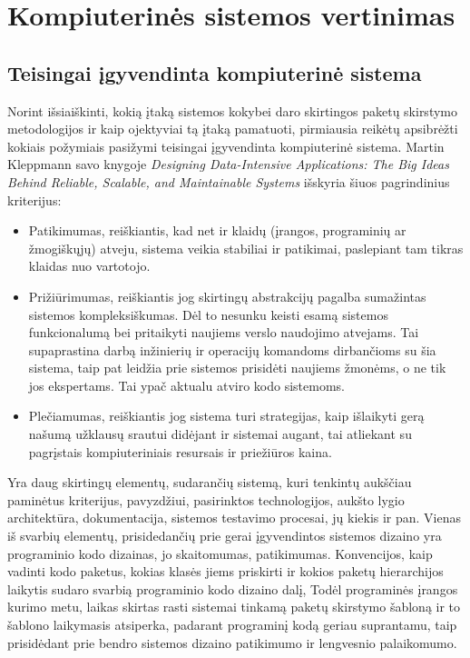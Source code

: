 \section{Kompiuterinės sistemos vertinimas}

\subsection{Teisingai įgyvendinta kompiuterinė sistema}
Norint išsiaiškinti, kokią įtaką sistemos kokybei daro skirtingos paketų skirstymo metodologijos ir kaip ojektyviai tą įtaką pamatuoti, pirmiausia
reikėtų apsibrėžti kokiais požymiais pasižymi teisingai įgyvendinta kompiuterinė sistema.
Martin Kleppmann savo knygoje \textit{Designing Data-Intensive Applications: The Big Ideas Behind Reliable, Scalable, and Maintainable Systems} išskyria šiuos pagrindinius kriterijus:
\begin{itemize}
    \item Patikimumas, reiškiantis, kad net ir klaidų (įrangos, programinių ar žmogiškųjų) atveju,
    sistema veikia stabiliai ir patikimai, paslepiant tam tikras klaidas nuo vartotojo\cite{DataIntensiveApplications}.
    \item Prižiūrimumas, reiškiantis jog skirtingų abstrakcijų pagalba sumažintas sistemos kompleksiškumas.
    Dėl to nesunku keisti esamą sistemos funkcionalumą bei pritaikyti naujiems verslo naudojimo atvejams.
    Tai supaprastina darbą inžinierių ir operacijų komandoms dirbančioms su šia sistema, taip pat leidžia prie sistemos prisidėti naujiems žmonėms, o ne
    tik jos ekspertams.
    Tai ypač aktualu atviro kodo sistemoms\cite{DataIntensiveApplications}.
    \item Plečiamumas, reiškiantis jog sistema turi strategijas, kaip išlaikyti gerą našumą užklausų
    srautui didėjant ir sistemai augant, tai atliekant su pagrįstais kompiuteriniais resursais ir
    priežiūros kaina\cite{DataIntensiveApplications}.
\end{itemize}
Yra daug skirtingų elementų, sudarančių sistemą, kuri tenkintų aukščiau paminėtus kriterijus,
pavyzdžiui, pasirinktos technologijos, aukšto lygio architektūra, dokumentacija, sistemos testavimo
procesai, jų kiekis ir pan.
Vienas iš svarbių elementų, prisidedančių prie gerai įgyvendintos sistemos dizaino yra programinio kodo dizainas, jo skaitomumas, patikimumas.
Konvencijos, kaip vadinti kodo paketus, kokias klasės jiems priskirti ir kokios paketų hierarchijos laikytis sudaro svarbią programinio kodo dizaino dalį,
Todėl programinės įrangos kurimo metu, laikas skirtas rasti sistemai tinkamą paketų skirstymo šabloną ir to šablono laikymasis atsiperka, padarant
programinį kodą geriau suprantamu, taip prisidėdant prie bendro sistemos dizaino patikimumo ir lengvesnio palaikomumo.


